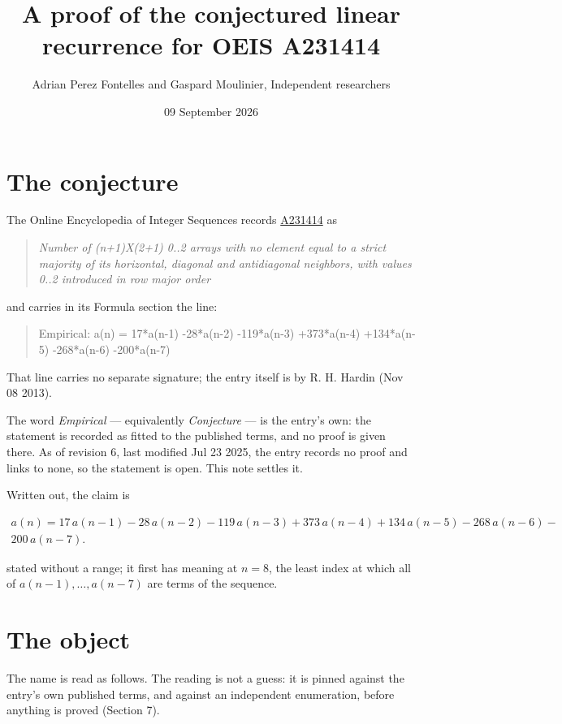 \documentclass[11pt]{article}
\title{A proof of the conjectured linear recurrence for OEIS A231414}
\author{Adrian Perez Fontelles and Gaspard Moulinier, Independent researchers}
\date{09 September 2026}
\theoremstyle{definition}
\begin{document}
\maketitle
\section{The conjecture}

The Online Encyclopedia of Integer Sequences records \href{https://oeis.org/A231414}{A231414} as

\begin{quote}\itshape Number of (n+1)X(2+1) 0..2 arrays with no element equal to a strict majority of its horizontal, diagonal and antidiagonal neighbors, with values 0..2 introduced in row major order\end{quote}

and carries in its Formula section the line:

\begin{quote}\ttfamily Empirical: a(n) = 17*a(n-1) -28*a(n-2) -119*a(n-3) +373*a(n-4) +134*a(n-5) -268*a(n-6) -200*a(n-7)\end{quote}

That line carries no separate signature; the entry itself is by R. H. Hardin (Nov 08 2013).

The word {\itshape Empirical} --- equivalently {\itshape Conjecture} --- is the entry's own: the statement is recorded as fitted to the published terms, and no proof is given there. As of revision 6, last modified Jul 23 2025, the entry records no proof and links to none, so the statement is open. This note settles it.

Written out, the claim is

\begin{multline*} a(n) = 17\,a(n-1) - 28\,a(n-2) - 119\,a(n-3) + 373\,a(n-4) + 134\,a(n-5) - 268\,a(n-6) - \\ 200\,a(n-7). \end{multline*}

stated without a range; it first has meaning at $n = 8$, the least index at which all of $a(n-1),\dots,a(n-7)$ are terms of the sequence.

\section{The object}

The name is read as follows. The reading is not a guess: it is pinned against the entry's own published terms, and against an independent enumeration, before anything is proved (Section 7).
\end{document}
